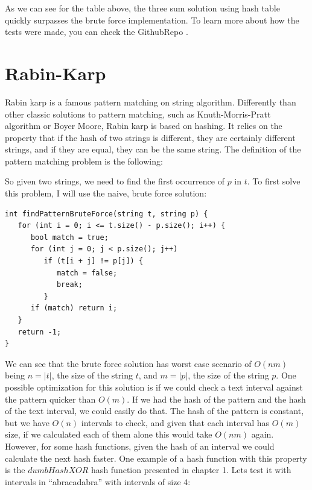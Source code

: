 \bigskip

As we can see for the table above, the three sum solution using hash table quickly surpasses the brute force implementation. To learn more about how the tests were made, you can check the GithubRepo \citep{GithubRepo}.

\section{Rabin-Karp}

Rabin karp is a famous pattern matching on string algorithm. Differently than other classic solutions to pattern matching, such as Knuth-Morris-Pratt algorithm or Boyer Moore, Rabin karp is based on hashing. It relies on the property that if the hash of two strings is different, they are certainly different strings, and if they are equal, they can be the same string. The definition of the pattern matching problem is the following:

\medskip


So given two strings, we need to find the first occurrence of \( p \) in \( t \). To first solve this problem, I will use the naive, brute force solution:

\begin{lstlisting}
int findPatternBruteForce(string t, string p) {
   for (int i = 0; i <= t.size() - p.size(); i++) {
      bool match = true;
      for (int j = 0; j < p.size(); j++)
         if (t[i + j] != p[j]) {
            match = false;
            break;
         }
      if (match) return i;
   }
   return -1;
}
\end{lstlisting}

We can see that the brute force solution has worst case scenario of \( O(nm) \) being \( n = |t| \), the size of the string \( t \), and \( m = |p| \), the size of the string \( p \). One possible optimization for this solution is if we could check a text interval against the pattern quicker than \( O(m) \). If we had the hash of the pattern and the hash of the text interval, we could easily do that. The hash of the pattern is constant, but we have \( O(n) \) intervals to check, and given that each interval has \( O(m) \) size, if we calculated each of them alone this would take \( O(nm) \) again. However, for some hash functions, given the hash of an interval we could calculate the next hash faster. One example of a hash function with this property is the \( dumbHashXOR \) hash function presented in chapter 1. Lets test it with intervals in ``abracadabra'' with intervals of size 4:

